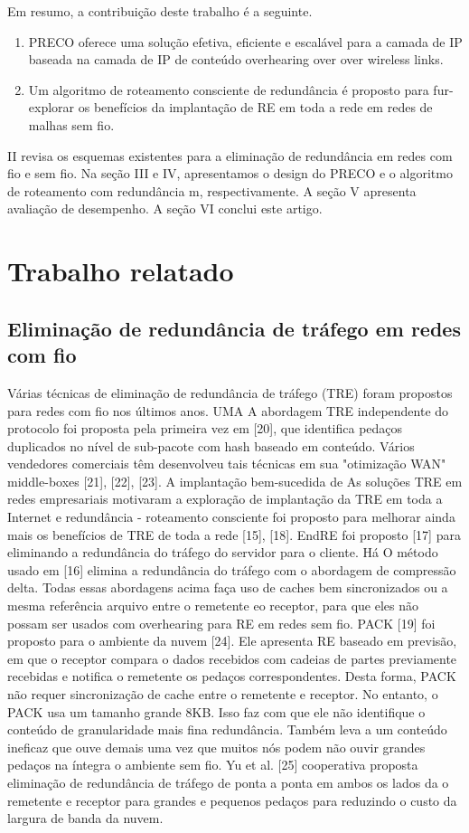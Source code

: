 \documentclass[12pt]{article}
\begin{document}
Em resumo, a contribuição deste trabalho é a seguinte.
\begin{enumerate}
\item PRECO oferece uma solução efetiva, eficiente e escalável
para a camada de IP baseada na camada de IP de conteúdo overhearing over over wireless
links.
\item Um algoritmo de roteamento consciente de redundância é proposto para fur-
explorar os benefícios da implantação de RE em toda a rede em
redes de malhas sem fio.
\end{enumerate}

II revisa os esquemas existentes para a eliminação de redundância em
redes com fio e sem fio. Na seção III e IV, apresentamos 
o design do PRECO e o algoritmo de roteamento com redundância
m, respectivamente. A seção V apresenta avaliação de desempenho.
A seção VI conclui este artigo.

\section{Trabalho relatado}
\subsection{	Eliminação de redundância de tráfego em redes com fio}
Várias técnicas de eliminação de redundância de tráfego (TRE)
foram propostos para redes com fio nos últimos anos. UMA
A abordagem TRE independente do protocolo foi proposta pela primeira vez em
[20], que identifica pedaços duplicados no nível de sub-pacote
com hash baseado em conteúdo. Vários vendedores comerciais têm
desenvolveu tais técnicas em sua "otimização WAN"
middle-boxes [21], [22], [23]. A implantação bem-sucedida de
As soluções TRE em redes empresariais motivaram a exploração
de implantação da TRE em toda a Internet e redundância -
roteamento consciente foi proposto para melhorar ainda mais os benefícios de
TRE de toda a rede [15], [18]. EndRE foi proposto [17] para
eliminando a redundância do tráfego do servidor para o cliente. Há
O método usado em [16] elimina a redundância do tráfego com o
abordagem de compressão delta. Todas essas abordagens acima
faça uso de caches bem sincronizados ou a mesma referência
arquivo entre o remetente eo receptor, para que eles não possam ser usados
com overhearing para RE em redes sem fio. PACK [19]
foi proposto para o ambiente da nuvem [24]. Ele apresenta
RE baseado em previsão, em que o receptor compara o
dados recebidos com cadeias de partes previamente recebidas e
notifica o remetente os pedaços correspondentes. Desta forma, PACK
não requer sincronização de cache entre o remetente
e receptor. No entanto, o PACK usa um tamanho grande
8KB. Isso faz com que ele não identifique o conteúdo de granularidade mais fina
redundância. Também leva a um conteúdo ineficaz que ouve demais
uma vez que muitos nós podem não ouvir grandes pedaços na íntegra
o ambiente sem fio. Yu et al. [25] cooperativa proposta
eliminação de redundância de tráfego de ponta a ponta em ambos os lados da
o remetente e receptor para grandes e pequenos pedaços para
reduzindo o custo da largura de banda da nuvem.
\end{document}
